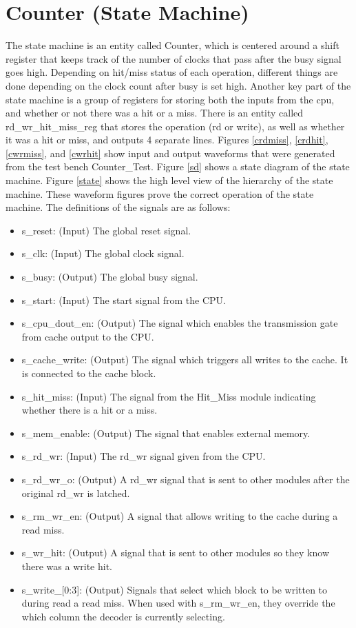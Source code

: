 \documentclass[10pt]{article}
\begin{document}
\section{Counter (State Machine)}
        The state machine is an entity called Counter, which is centered around
a shift register that keeps track of the number of clocks that pass after the
busy signal goes high. Depending on hit/miss status of each operation, different
things are done depending on the clock count after busy is set high. Another key
part of the state machine is a group of registers for storing both the inputs
from the cpu, and whether or not there was a hit or a miss. There is an entity
called rd_wr_hit_miss_reg that stores the operation (rd or write), as well as
whether it was a hit or miss, and outputs 4 separate lines. Figures
\ref{crdmiss}, \ref{crdhit}, \ref{cwrmiss}, and \ref{cwrhit} show input and
output waveforms that were generated from the test bench Counter_Test. Figure
\ref{sd} shows a state diagram of the state machine. Figure \ref{state} shows
the high level view of the hierarchy of the state machine. These waveform figures
prove the correct operation of the state machine. The definitions of the signals
are as follows:
\begin{itemize}
    \item s_reset: (Input) The global reset signal.
    \item s_clk: (Input) The global clock signal.
    \item s_busy: (Output) The global busy signal.
    \item s_start: (Input) The start signal from the CPU.
    \item s_cpu_dout_en: (Output) The signal which enables the transmission gate
from cache output to the CPU.
    \item s_cache_write: (Output) The signal which triggers all writes to the
cache. It is connected to the cache block.
    \item s_hit_miss: (Input) The signal from the Hit_Miss module indicating whether
there is a hit or a miss.
    \item s_mem_enable: (Output) The signal that enables external memory.
    \item s_rd_wr: (Input) The rd_wr signal given from the CPU.
    \item s_rd_wr_o: (Output) A rd_wr signal that is sent to other modules after
the original rd_wr is latched.
    \item s_rm_wr_en: (Output) A signal that allows writing to the cache during
a read miss.
    \item s_wr_hit: (Output) A signal that is sent to other modules so they know
there was a write hit.
    \item s_write_[0:3]: (Output) Signals that select which block to be written
to during read a read miss. When used with s_rm_wr_en, they override the which
column the decoder is currently selecting.
\end{itemize} 
\end{document}

